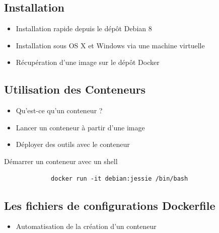 \documentclass{beamer}
\begin{document}
    \subsection{Installation}
    \begin{frame}
       \begin{itemize}
          \item{Installation rapide depuis le dépôt Debian 8}
          \item{Installation sous OS X et Windows via une machine virtuelle}
          \item{Récupération d'une image sur le dépôt Docker}
       \end{itemize}
    \end{frame}

    \subsection{Utilisation des Conteneurs}
    \begin{frame}[containsverbatim]
       \begin{itemize}
          \item{Qu'est-ce qu'un conteneur ?}
          \item{Lancer un conteneur à partir d'une image}
          \item{Déployer des outils avec le conteneur}
       \end{itemize}
     
       \begin{exampleblock}{Démarrer un conteneur avec un shell}
          \begin{verbatim}
             docker run -it debian:jessie /bin/bash
          \end{verbatim}
       \end{exampleblock}
    \end{frame}

    \subsection{Les fichiers de configurations Dockerfile}
    \begin{frame}
       \begin{itemize}
          \item{Automatisation de la création d'un conteneur}
          
       \end{itemize}
    \end{frame}
\end{document}
